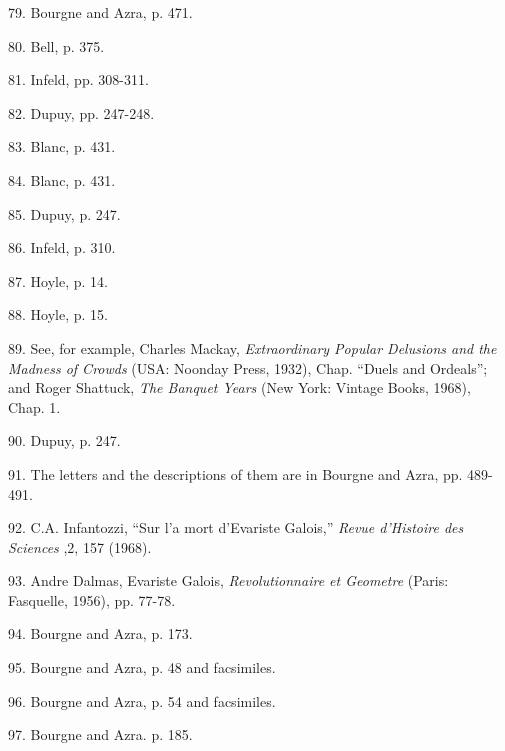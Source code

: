 \documentclass[12pt]{article}
\begin{document}
79. Bourgne and Azra, p. 471. 

80. Bell, p. 375. 

81. Infeld, pp. 308-311. 

82. Dupuy, pp. 247-248. 

83. Blanc, p. 431. 

84. Blanc, p. 431. 

85. Dupuy, p. 247. 

86. Infeld, p. 310. 

87. Hoyle, p. 14. 

88. Hoyle, p. 15. 

89. See, for example, Charles Mackay, \emph{Extraordinary Popular Delusions and the Madness of Crowds} (USA: Noonday Press, 1932), Chap. ``Duels and Ordeals''; and Roger Shattuck, \emph{The Banquet Years} (New York: Vintage Books, 1968), Chap. 1. 

90. Dupuy, p. 247. 

91. The letters and the descriptions of them are in Bourgne and Azra, pp. 489-491. 

92. C.A. Infantozzi, ``Sur l'a mort d'Evariste Galois,'' {\it Revue d'Histoire des Sciences} ,2, 157 (1968). 

93. Andre Dalmas, Evariste Galois, {\it Revolutionnaire et Geometre} (Paris: Fasquelle, 1956), pp. 77-78. 

94. Bourgne and Azra, p. 173. 

95. Bourgne and Azra, p. 48 and facsimiles. 

96. Bourgne and Azra, p. 54 and facsimiles. 

97. Bourgne and Azra. p. 185.  
\end{document}
